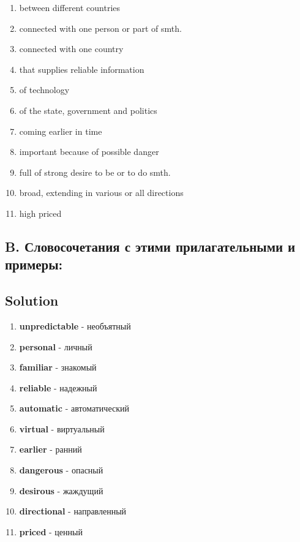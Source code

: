 \begin{enumerate}
      \item between different countries
      \item connected with one person or part of smth.
      \item connected with one country
      \item that supplies reliable information
      \item of technology
      \item of the state, government and politics
      \item coming earlier in time
      \item important because of possible danger
      \item full of strong desire to be or to do smth.
      \item broad, extending in various or all directions
      \item high priced
\end{enumerate}

\subsection*{B. Словосочетания с этими прилагательными и примеры:}

\subsection*{Solution}

\begin{enumerate}
      \item \textbf{unpredictable} - необъятный
      \item \textbf{personal} - личный
      \item \textbf{familiar} - знакомый
      \item \textbf{reliable} - надежный
      \item \textbf{automatic} - автоматический
      \item \textbf{virtual} - виртуальный
      \item \textbf{earlier} - ранний
      \item \textbf{dangerous} - опасный
      \item \textbf{desirous} - жаждущий
      \item \textbf{directional} - направленный
      \item \textbf{priced} - ценный
\end{enumerate}

